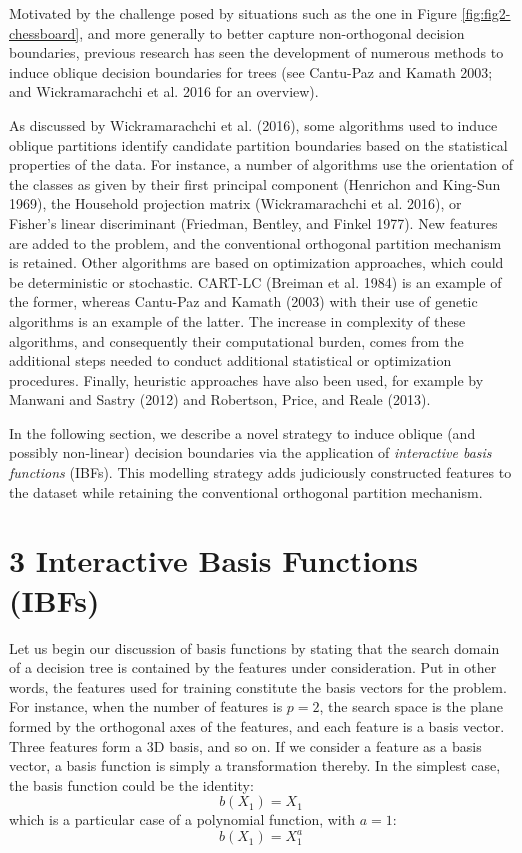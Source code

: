 \documentclass[]{elsarticle} %
\begin{document}
Motivated by the challenge posed by situations such as the one in Figure
\ref{fig:fig2-chessboard}, and more generally to better capture
non-orthogonal decision boundaries, previous research has seen the
development of numerous methods to induce oblique decision boundaries
for trees (see Cantu-Paz and Kamath 2003; and Wickramarachchi et al.
2016 for an overview).

As discussed by Wickramarachchi et al. (2016), some algorithms used to
induce oblique partitions identify candidate partition boundaries based
on the statistical properties of the data. For instance, a number of
algorithms use the orientation of the classes as given by their first
principal component (Henrichon and King-Sun 1969), the Household
projection matrix (Wickramarachchi et al. 2016), or Fisher's linear
discriminant (Friedman, Bentley, and Finkel 1977). New features are
added to the problem, and the conventional orthogonal partition
mechanism is retained. Other algorithms are based on optimization
approaches, which could be deterministic or stochastic. CART-LC (Breiman
et al. 1984) is an example of the former, whereas Cantu-Paz and Kamath
(2003) with their use of genetic algorithms is an example of the latter.
The increase in complexity of these algorithms, and consequently their
computational burden, comes from the additional steps needed to conduct
additional statistical or optimization procedures. Finally, heuristic
approaches have also been used, for example by Manwani and Sastry (2012)
and Robertson, Price, and Reale (2013).

In the following section, we describe a novel strategy to induce oblique
(and possibly non-linear) decision boundaries via the application of
\emph{interactive basis functions} (IBFs). This modelling strategy adds
judiciously constructed features to the dataset while retaining the
conventional orthogonal partition mechanism.

\section{3 Interactive Basis Functions
(IBFs)}\label{interactive-basis-functions-ibfs}

Let us begin our discussion of basis functions by stating that the
search domain of a decision tree is contained by the features under
consideration. Put in other words, the features used for training
constitute the basis vectors for the problem. For instance, when the
number of features is \(p=2\), the search space is the plane formed by
the orthogonal axes of the features, and each feature is a basis vector.
Three features form a 3D basis, and so on. If we consider a feature as a
basis vector, a basis function is simply a transformation thereby. In
the simplest case, the basis function could be the identity: \[
b(X_1) = X_1
\] which is a particular case of a polynomial function, with \(a=1\): \[
b(X_1) = X_1^a
\]
\end{document}
